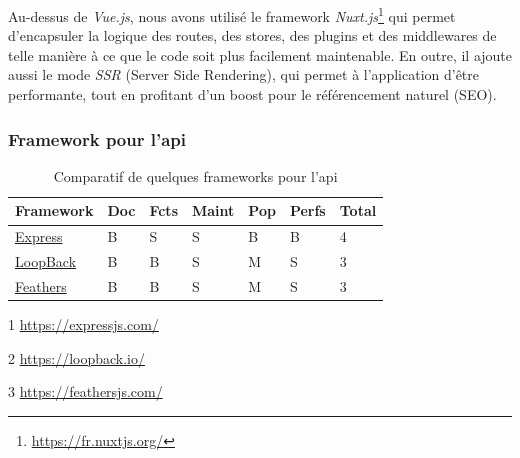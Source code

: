 \renewcommand{\thefootnote}{\alph{footnote}}

Au-dessus de \textit{Vue.js}, nous avons utilisé le framework \textit{Nuxt.js}\footnote{\url{https://fr.nuxtjs.org/}} qui permet d'encapsuler la logique des routes, des stores, des plugins et des middlewares de telle manière à ce que le code soit plus facilement maintenable. En outre, il ajoute aussi le mode \textit{SSR} (Server Side Rendering), qui permet à l'application d'être performante, tout en profitant d'un boost pour le référencement naturel (SEO).

\renewcommand{\thefootnote}{\arabic{footnote}}

\subsubsection*{Framework pour l'\Gls{api}}

\begin{table}[H]
    \centering
    \begin{threeparttable}
    \begin{tabular}{| l | l | l | l | l | l | l |}
    \hline
        Framework & Doc & Fcts & Maint & Pop & Perfs & Total \\
    \hline
        \href{https://expressjs.com/}{Express}\tnote{1} &
        B &  
        S &
        S &            
        B &              
        B &
        4 \\
    \hline
        \href{https://loopback.io/}{LoopBack}\tnote{2} &
        B &                
        B &   
        S &
        M &              
        S &      
        3 \\
    \hline
        \href{https://feathersjs.com/}{Feathers}\tnote{3} &
        B &                
        B &     
        S &
        M &              
        S &       
        3 \\  
    \hline
    \end{tabular}
    \begin{tablenotes}
        \item[1] \url{https://expressjs.com/}
        \item[2] \url{https://loopback.io/}
        \item[3] \url{https://feathersjs.com/}
    \end{tablenotes}
    \end{threeparttable}
    \caption{Comparatif de quelques frameworks pour l'\Gls{api}}
    \label{table:compFrameworksAPI}
\end{table}

